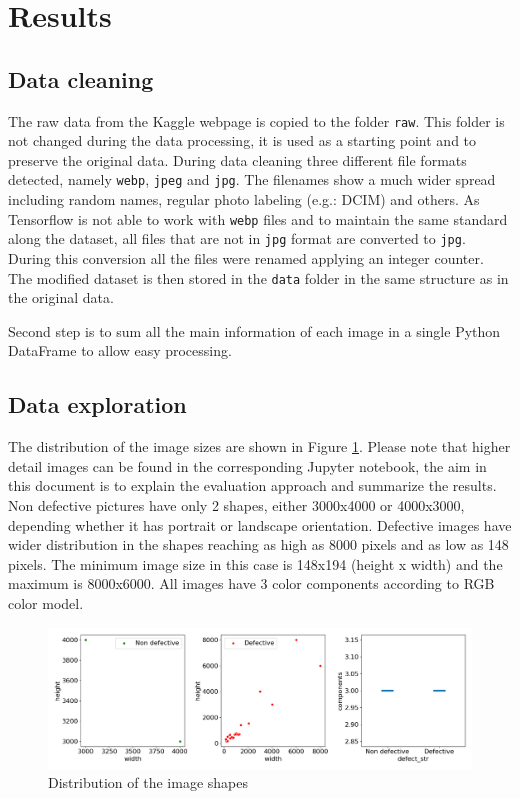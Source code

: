 \documentclass[10pt, final]{article}
\begin{document}
	\section{Results} \label{sec:results}
		\subsection{Data cleaning}			
			The raw data from the Kaggle webpage \cite{noauthor_railway_nodate} is copied to the folder \lstinline{raw}.
			This folder is not changed during the data processing, it is used as a starting point and to preserve the 
			original data.
			During data cleaning three different file formats detected, namely \lstinline{webp}, \lstinline{jpeg} 
			and \lstinline{jpg}.
			The filenames show a much wider spread including random names, regular photo labeling (e.g.: DCIM) and others.
			As Tensorflow is not able to work with \lstinline{webp} files and to maintain the same standard along
			the dataset, all files that are not in \lstinline{jpg} format are converted to \lstinline{jpg}.
			During this conversion all the files were renamed applying an integer counter.
			The modified dataset is then stored in the \lstinline{data} folder in the same structure as in the original data.
			
			Second step is to sum all the main information of each image in a single Python DataFrame to allow easy processing.
		\subsection{Data exploration}
			The distribution of the image sizes are shown in Figure \ref{fig:shape_dist}. 
			Please note that higher detail images can be found in the corresponding Jupyter notebook, the aim in this document
			is to explain the evaluation approach and summarize the results.
			Non defective pictures have only 2 shapes, either 3000x4000 or 4000x3000, depending whether it has
			portrait or landscape orientation.
			Defective images have wider distribution in the shapes reaching as high as 8000 pixels and as low as 148 pixels.
			The minimum image size in this case is 148x194 (height x width) and the maximum is 8000x6000.
			All images have 3 color components according to RGB color model.
			\begin{figure}[!ht]
				\centering
				\includegraphics[width=\textwidth]{./tex_graphs/shapes.png}
				\caption{Distribution of the image shapes}
				\label{fig:shape_dist}
			\end{figure}
\end{document}
